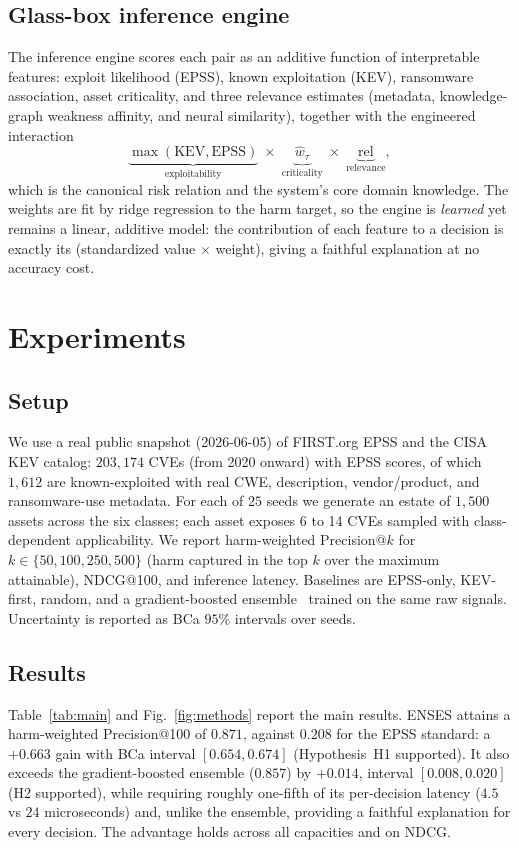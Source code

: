 \documentclass[journal]{IEEEtran}
\begin{document}
\subsection{Glass-box inference engine}
The inference engine scores each pair as an additive function of interpretable
features: exploit likelihood (EPSS), known exploitation (KEV), ransomware
association, asset criticality, and three relevance estimates (metadata,
knowledge-graph weakness affinity, and neural similarity), together with the
engineered interaction
\begin{equation}
\underbrace{\max(\mathrm{KEV},\mathrm{EPSS})}_{\text{exploitability}}\;\times\;
\underbrace{\hat{w}_\tau}_{\text{criticality}}\;\times\;
\underbrace{\mathrm{rel}}_{\text{relevance}},
\end{equation}
which is the canonical risk relation and the system's core domain knowledge. The
weights are fit by ridge regression to the harm target, so the engine is
\emph{learned} yet remains a linear, additive model: the contribution of each
feature to a decision is exactly its (standardized value $\times$ weight), giving
a faithful explanation at no accuracy cost.

\section{Experiments}
\label{sec:exp}
\subsection{Setup}
We use a real public snapshot (2026-06-05) of FIRST.org EPSS and the CISA KEV
catalog: $203{,}174$ CVEs (from 2020 onward) with EPSS scores, of which
$1{,}612$ are known-exploited with real CWE, description, vendor/product, and
ransomware-use metadata. For each of $25$ seeds we generate an estate of
$1{,}500$ assets across the six classes; each asset exposes 6 to 14 CVEs sampled
with class-dependent applicability. We report harm-weighted Precision@$k$ for
$k\in\{50,100,250,500\}$ (harm captured in the top $k$ over the maximum
attainable), NDCG@100, and inference latency. Baselines are EPSS-only, KEV-first,
random, and a gradient-boosted ensemble~\cite{chen2016xgboost} trained on the
same raw signals. Uncertainty is reported as BCa $95\%$ intervals over seeds.



\subsection{Results}
Table~\ref{tab:main} and Fig.~\ref{fig:methods} report the main results. ENSES
attains a harm-weighted Precision@100 of $0.871$, against $0.208$ for the EPSS
standard: a $+0.663$ gain with BCa interval $[0.654,0.674]$ (Hypothesis~H1
supported). It also exceeds the gradient-boosted ensemble ($0.857$) by $+0.014$,
interval $[0.008,0.020]$ (H2 supported), while requiring roughly one-fifth of
its per-decision latency ($4.5$ vs $24$ microseconds) and, unlike the ensemble,
providing a faithful explanation for every decision. The advantage holds across
all capacities and on NDCG.
\end{document}
